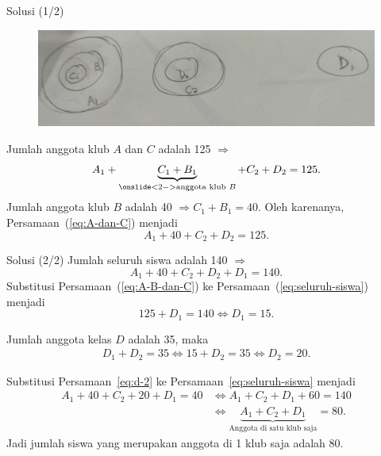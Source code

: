 \documentclass[english,t]{beamer}
\begin{document}
\begin{frame}{Solusi (1/2)}
	\begin{figure}[!ht]
		\centering
		\includegraphics[scale=0.2]{images/solusi-soal-2}		
	\end{figure}
	Jumlah anggota klub $A$ dan $C$ adalah 125 $\Rightarrow$
	\begin{equation}
		A_1 + \underbrace{C_1 + B_1}_{\onslide<2->{\text{anggota klub }B}} + C_2 + D_2 = 125.
		\label{eq:A-dan-C}
	\end{equation}
	Jumlah anggota klub $B$ adalah 40 $\Rightarrow C_1 + B_1 = 40$. Oleh karenanya, Persamaan~(\ref{eq:A-dan-C}) menjadi 	
	\begin{equation}
		A_1 + 40 + C_2 + D_2 = 125.
		\label{eq:A-B-dan-C}
	\end{equation}
\end{frame}

\begin{frame}{Solusi (2/2)}
Jumlah seluruh siswa adalah 140 $\Rightarrow$
\begin{equation}
	A_1 + 40 + C_2 + D_2 + D_1 = 140.
	\label{eq:seluruh-siswa}
\end{equation}
Substitusi Persamaan~(\ref{eq:A-B-dan-C}) ke Persamaan~(\ref{eq:seluruh-siswa}) menjadi
\begin{equation}
	125 + D_1 = 140 \Longleftrightarrow D_1 = 15.
	\label{eq:d-1}
\end{equation}

Jumlah anggota kelas $D$ adalah 35, maka 
\begin{align}
	D_1 + D_2 = 35 \Longleftrightarrow 15 + D_2 = 35 \Longleftrightarrow D_2 = 20.
	\label{eq:d-2}
\end{align}

Substitusi Persamaan~\eqref{eq:d-2} ke Persamaan~\eqref{eq:seluruh-siswa} menjadi
\begin{align*}
	A_1 + 40 + C_2 + 20 + D_1 = 40 &\Leftrightarrow A_1 + C_2 + D_1 + 60 = 140 \\
	                               &\Leftrightarrow \underbrace{A_1 + C_2 + D_1}_{\text{Anggota di satu klub saja}} = 80. 
\end{align*}
Jadi jumlah siswa yang merupakan anggota di 1 klub saja adalah 80.
\end{frame}
\end{document}
